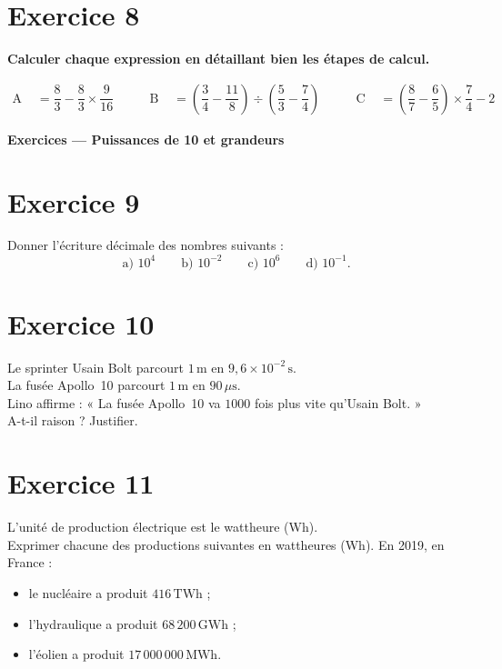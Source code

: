 \documentclass[a4paper,11pt]{article}
\begin{document}
\section*{Exercice 8}
\textbf{Calculer chaque expression en détaillant bien les étapes de calcul.}

\[
\begin{aligned}
\text{A }&= \dfrac{8}{3}-\dfrac{8}{3}\times\dfrac{9}{16}
&\qquad
\text{B }&= \left(\dfrac{3}{4}-\dfrac{11}{8}\right)\div\left(\dfrac{5}{3}-\dfrac{7}{4}\right)
&\qquad
\text{C }&= \left(\dfrac{8}{7}-\dfrac{6}{5}\right)\times\dfrac{7}{4}-2
\end{aligned}
\]

\bigskip
{\Large \textbf{Exercices — Puissances de 10 et grandeurs}}\par\medskip

\section*{Exercice 9}
Donner l’écriture décimale des nombres suivants :
\[
\text{a) }10^{4} \qquad
\text{b) }10^{-2} \qquad
\text{c) }10^{6} \qquad
\text{d) }10^{-1}.
\]

\section*{Exercice 10}
Le sprinter Usain Bolt parcourt \(1\,\text{m}\) en \(9{,}6\times 10^{-2}\,\text{s}\).\\
La fusée Apollo~10 parcourt \(1\,\text{m}\) en \(90\,\mu\text{s}\).\\
Lino affirme : « La fusée Apollo~10 va \(1000\) fois plus vite qu'Usain Bolt. »\\
A-t-il raison ? Justifier.

\section*{Exercice 11}
L’unité de production électrique est le wattheure (Wh).\\
Exprimer chacune des productions suivantes en wattheures (Wh). En 2019, en France :
\begin{itemize}
  \item le nucléaire a produit \(416\,\text{TWh}\) ;
  \item l’hydraulique a produit \(68\,200\,\text{GWh}\) ;
  \item l’éolien a produit \(17\,000\,000\,\text{MWh}\).
\end{itemize}
\end{document}
